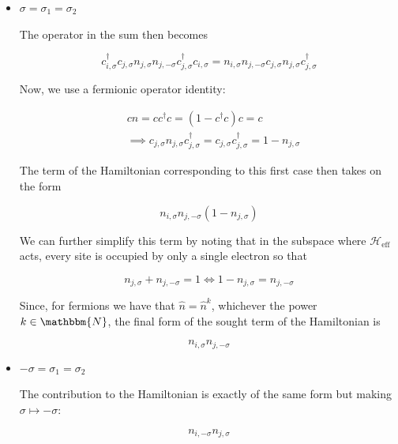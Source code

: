 \documentclass[10pt, twocolumn, twoside]{article}
\begin{document}
\begin{itemize}

\item $\sigma = \sigma_1 = \sigma_2$

The operator in the sum then becomes

\begin{equation*}
c_{i,\sigma}^\dagger c_{j,\sigma} n_{j,\sigma} n_{j, -\sigma} c_{j, \sigma}^\dagger c_{i, \sigma} = n_{i,\sigma} n_{j, -\sigma} c_{j,\sigma} n_{j, \sigma} c_{j, \sigma}^\dagger
\end{equation*}

Now, we use a fermionic operator identity:

\begin{equation*}
\begin{split}
&c n = c c^\dagger c = ( 1 -  c^\dagger c ) c = c \\
&\implies c_{j,\sigma} n_{j,\sigma} c_{j,\sigma}^\dagger = c_{j,\sigma} c_{j,\sigma}^\dagger = 1 - n_{j,\sigma}
\end{split}
\end{equation*}

The term of the Hamiltonian corresponding to this first case then takes on the form

\begin{equation*}
n_{i,\sigma} n_{j,-\sigma} ( 1 - n_{j, \sigma} )
\end{equation*}

We can further simplify this term by noting that in the subspace where $\mathcal{H}_{\text{eff}}$ acts, every site is occupied by only a single electron so that

\begin{equation*}
n_{j,\sigma} + n_{j,-\sigma} = 1 \iff 1 - n_{j,\sigma} = n_{j,-\sigma}
\end{equation*}

Since, for fermions we have that $\hat{n} = \hat{n}^k$, whichever the power $k \in \mathbbm{N}$, the final form of the sought term of the Hamiltonian is

\begin{equation*}
n_{i,\sigma} n_{j, -\sigma}
\end{equation*}

\item $-\sigma = \sigma_1 = \sigma_2$

The contribution to the Hamiltonian is exactly of the same form but making $\sigma \mapsto -\sigma$:

\begin{equation*}
n_{i,-\sigma} n_{j, \sigma}
\end{equation*}


\end{itemize}
\end{document}
